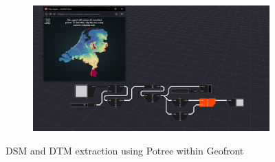 \begin{figure}
  \centering
  \begin{subfigure}[b]{0.90\linewidth}
    \centering
    \includegraphics[width=\linewidth]{potree-1.PNG}
  \end{subfigure}%
  \caption[]{DSM and DTM extraction using Potree within Geofront}%
  \label{fig:potree-overview}
\end{figure}

